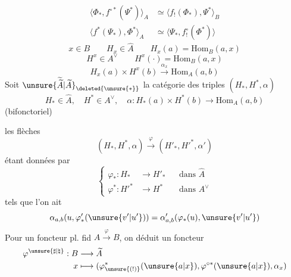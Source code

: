 \[
\boxed{\begin{aligned}
\langle\Phi_*,f^{\circ *}(\Psi^*)\rangle_A&\simeq\langle f_!(\Phi_*),\Psi^*\rangle_B\\
\langle f^*(\Psi_*),\Phi^*\rangle_A&\simeq\langle\Psi_*,f^\circ_!(\Phi^*)\rangle
\end{aligned}}
\]
\[
x\in B\qquad H_x\in\widehat A\qquad H_x(a)=\mathrm{Hom}_B(a,x)
\]
\[
H^x\in A^\vee\qquad H^x(\cdot)=\mathrm{Hom}_B(a,x)
\]
\[
H_x(a)\times H^x(b)\xrightarrow{\alpha_x}\mathrm{Hom}_A(a,b)
\]
Soit $\unsure{\widetilde{\widetilde A}|\widetilde A}_{\deleted{\unsure{*}}}$ la catégorie des triples $(H_*,H^*,\alpha)$
\[
H_*\in\widehat A,\quad H^*\in A^\vee,\quad
\alpha:H_*(a)\times H^*(b)\longrightarrow\mathrm{Hom}_A(a,b)
\]
(bifonctoriel)

les flèches
\[
(H_*,H^*,\alpha)\xrightarrow{\varphi}(H'_*,H'^*,\alpha')
\]
étant données par
\[
\left\{\begin{aligned}
\varphi_*:H_*&\longrightarrow H'_*&&\text{dans }\widehat A\\
\varphi^*:H'^*&\longrightarrow H^*&&\text{dans }A^\vee
\end{aligned}\right.
\]
tels que  l'on ait
\[
\alpha_{a,b}(u,\varphi'_*(\unsure{v'|u'}))=\alpha'_{a,b}(\varphi_*(u),\unsure{v'|u'})
\]
Pour un foncteur pl. fid \(A\xrightarrow{\varphi}B\), on déduit un foncteur
\[
\begin{aligned}
\varphi^{\unsure{\sharp|\natural}}:B&\longrightarrow\widetilde A\\
x&\longmapsto(\varphi^*_{\unsure{(!)}}(\unsure{a|x}),\varphi^{\circ *}(\unsure{a|x}),\alpha_x)
\end{aligned}
\]

